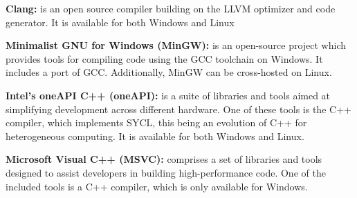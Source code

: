 
\noindent\textbf{Clang:} is an open source compiler building on the LLVM optimizer and code generator. It is available for both Windows and Linux\cite{clang}\newline

\noindent\textbf{Minimalist GNU for Windows (MinGW):} is an open-source project which provides tools for compiling code using the GCC toolchain on Windows. It includes a port of GCC. Additionally, MinGW can be cross-hosted on Linux.\cite{mingw}\newline

\noindent\textbf{Intel's oneAPI C++ (oneAPI):} is a suite of libraries and tools aimed at simplifying development across different hardware. One of these tools is the C++ compiler, which implements SYCL, this being an evolution of C++ for heterogeneous computing. It is available for both Windows and Linux.\cite{oneapi}\newline


\noindent\textbf{Microsoft Visual C++ (MSVC):}  comprises a set of libraries and tools designed to assist developers in building high-performance code. One of the included tools is a C++ compiler, which is only available for Windows\cite{msvc}.\newline

